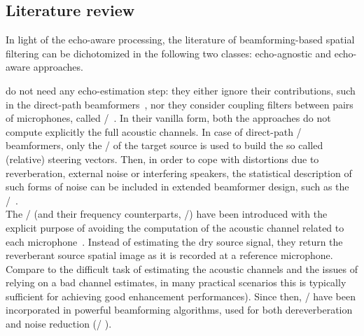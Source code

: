 \subsection{Literature review}
In light of the echo-aware processing, the literature of beamforming-based spatial filtering can be dichotomized in the following two classes: echo-agnostic and echo-aware approaches.

 do not need any echo-estimation step:
they either ignore their contributions, such in the direct-path beamformers~, nor they consider coupling filters between pairs of microphones, called \ReIRdef/~.
In their vanilla form, both the approaches do not compute explicitly the full acoustic channels.
In case of direct-path \DStxtdef/ beamformers, only the \DOAs/ of the target source is used to build the so called (relative) steering vectors.
Then, in order to cope with distortions due to reverberation, external noise or interfering speakers, the statistical description of such forms of noise can be included in extended beamformer design, such as the \MVDRtxt/~.
\\The \ReIRs/ (and their frequency counterparts, \ReTFs/) have been introduced with the explicit purpose of avoiding the computation of the acoustic channel related to each microphone~.
Instead of estimating the dry source signal, they return the reverberant source spatial image as it is recorded at a reference microphone.
Compare to the difficult task of estimating the acoustic channels and the issues of relying on a bad channel estimates, in many practical scenarios this is typically sufficient for achieving good enhancement performances).
Since then, \ReIRs/ have been incorporated in powerful beamforming algorithms, used for both dereverberation and noise reduction (\eg/ ).

